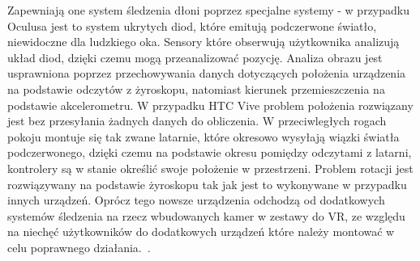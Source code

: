 Zapewniają one system śledzenia dłoni poprzez specjalne systemy - w przypadku Oculusa jest to system ukrytych diod, które emitują podczerwone światło, niewidoczne dla ludzkiego oka. Sensory które obserwują użytkownika analizują układ diod, dzięki czemu mogą przeanalizować pozycję. Analiza obrazu jest usprawniona poprzez przechowywania danych dotyczących położenia urządzenia na podstawie odczytów z żyroskopu, natomiast kierunek przemieszczenia na podstawie akcelerometru. W przypadku HTC Vive problem położenia rozwiązany jest bez przesyłania żadnych danych do obliczenia. W przeciwległych rogach pokoju montuje się tak zwane latarnie, które okresowo wysyłają wiązki światła podczerwonego, dzięki czemu na podstawie okresu pomiędzy odczytami z latarni, kontrolery są w stanie określić swoje położenie w przestrzeni. Problem rotacji jest rozwiązywany na podstawie żyroskopu tak jak jest to wykonywane w przypadku innych urządzeń. Oprócz tego nowsze urządzenia odchodzą od dodatkowych systemów śledzenia na rzecz wbudowanych kamer w zestawy do VR, ze względu na niechęć użytkowników do dodatkowych urządzeń które należy montować w celu poprawnego działania.~\cite{sledzenie, kontroleryDZB}.


